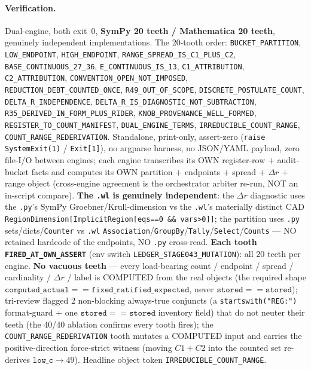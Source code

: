 \paragraph{Verification.}
Dual-engine, both exit~0, \textbf{SymPy 20 teeth / Mathematica 20 teeth}, genuinely
independent implementations. The 20-tooth order: \texttt{BUCKET\_PARTITION},
\texttt{LOW\_ENDPOINT}, \texttt{HIGH\_ENDPOINT}, \texttt{RANGE\_SPREAD\_IS\_C1\_PLUS\_C2},
\texttt{BASE\_CONTINUOUS\_27\_36}, \texttt{E\_CONTINUOUS\_IS\_13},
\texttt{C1\_ATTRIBUTION}, \texttt{C2\_ATTRIBUTION}, \texttt{CONVENTION\_OPEN\_NOT\_IMPOSED},
\texttt{REDUCTION\_DEBT\_COUNTED\_ONCE}, \texttt{R49\_OUT\_OF\_SCOPE},
\texttt{DISCRETE\_POSTULATE\_COUNT}, \texttt{DELTA\_R\_INDEPENDENCE},
\texttt{DELTA\_R\_IS\_DIAGNOSTIC\_NOT\_SUBTRACTION}, \texttt{R35\_DERIVED\_IN\_FORM\_PLUS\_RIDER},
\texttt{KNOB\_PROVENANCE\_WELL\_FORMED}, \texttt{REGISTER\_TO\_COUNT\_MANIFEST},
\texttt{DUAL\_ENGINE\_TERMS}, \texttt{IRREDUCIBLE\_COUNT\_RANGE},
\texttt{COUNT\_RANGE\_REDERIVATION}. Standalone, print-only, assert-zero
(\texttt{raise SystemExit(1)} / \texttt{Exit[1]}), no argparse harness, no JSON/YAML
payload, zero file-I/O between engines; each engine transcribes its OWN register-row
\(+\) audit-bucket facts and computes its OWN partition \(+\) endpoints \(+\) spread
\(+\) \(\Delta r\) \(+\) range object (cross-engine agreement is the orchestrator
arbiter re-run, NOT an in-script compare). \textbf{The \texttt{.wl} is genuinely
independent}: the \(\Delta r\) diagnostic uses the \texttt{.py}'s SymPy
Groebner/Krull-dimension vs the \texttt{.wl}'s materially distinct CAD
\texttt{RegionDimension[ImplicitRegion[eqs==0 \&\& vars>0]]}; the partition uses
\texttt{.py} sets/dicts/\texttt{Counter} vs \texttt{.wl}
\texttt{Association}/\texttt{GroupBy}/\texttt{Tally}/\texttt{Select}/\texttt{Counts}
--- NO retained hardcode of the endpoints, NO \texttt{.py} cross-read. \textbf{Each
tooth \texttt{FIRED\_AT\_OWN\_ASSERT}} (env switch \texttt{LEDGER\_STAGE043\_MUTATION}):
all 20 teeth per engine. \textbf{No vacuous teeth} --- every load-bearing count / endpoint /
spread / cardinality / \(\Delta r\) / label is COMPUTED from the real objects (the
required shape \(\texttt{computed\_actual}==\texttt{fixed\_ratified\_expected}\), never
\(\texttt{stored}==\texttt{stored}\)); tri-review flagged 2 non-blocking always-true conjuncts
(a \texttt{startswith("REG:")} format-guard \(+\) one \(\texttt{stored}==\texttt{stored}\) inventory field)
that do not neuter their teeth (the 40/40 ablation confirms every tooth fires); the \texttt{COUNT\_RANGE\_REDERIVATION} tooth
mutates a COMPUTED input and carries the positive-direction force-strict witness
(moving \(C1+C2\) into the counted set re-derives \(\texttt{low\_c}\to49\)). Headline
object token \texttt{IRREDUCIBLE\_COUNT\_RANGE}.

